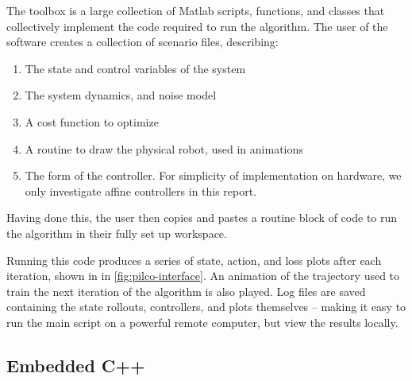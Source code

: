 \documentclass[main.tex]{subfiles}
\begin{document}
	The {\Pilco} toolbox is a large collection of Matlab scripts, functions, and classes that collectively implement the code required to run the {\Pilco} algorithm. The user of the software creates a collection of scenario files, describing:
	\begin{enumerate}[noitemsep]
		\item The state and control variables of the system
		\item The system dynamics, and noise model
		\item A cost function to optimize
		\item A routine to draw the physical robot, used in animations
		\item The form of the controller. For simplicity of implementation on hardware, we only investigate affine controllers in this report.
	\end{enumerate}
	Having done this, the user then copies and pastes a routine block of code to run the {\Pilco} algorithm in their fully set up workspace.

	Running this code produces a series of state, action, and loss plots after each iteration, shown in in \cref{fig:pilco-interface}.
	An animation of the trajectory used to train the next iteration of the algorithm is also played.
	Log files are saved containing the state rollouts, controllers, and plots themselves -- making it easy to run the main script on a powerful remote computer, but view the results locally.

	\subsection{Embedded C++}
	\label{sec:review:electrical}
\end{document}
